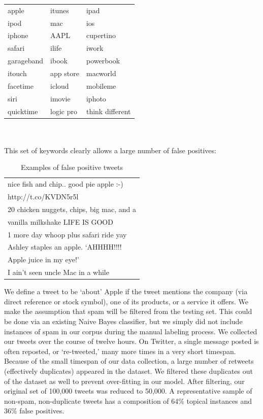 \documentclass[letterpaper]{article}
\begin{document}
\begin{tabular}{l l l}
apple & itunes & ipad \\
ipod & mac & ios \\
iphone & AAPL & cupertino \\
safari&ilife&iwork \\
garageband&ibook&powerbook \\
itouch&app store&macworld \\
facetime&icloud&mobileme \\
siri&imovie&iphoto \\
quicktime&logic pro&think different
\end{tabular} \\
~\\

This set of keywords clearly allows a large number of false positives:

\begin{table}[ht]
\centering
\begin{tabular}{|l|}
	\hline
	nice fish and chip.. good pie apple :-) \\ http://t.co/KVDN5r5l \\ \hline
	20 chicken nuggets, chips, big mac, and a \\ vanilla milkshake LIFE IS GOOD \\ \hline
	1 more day whoop plus safari ride yay \\ \hline
	Ashley staples an apple.  `AHHHH!!!! \\ Apple juice in my eye!' \\ \hline
	I ain't seen uncle Mac in a while \\
	\hline
\end{tabular}
\caption{Examples of false positive tweets}
\label{tab:myfirsttable}
\end{table}


We define a tweet to be `about' Apple if the tweet mentions the company (via direct reference or stock symbol), one of its products, or a service it offers. We make the assumption that spam will be filtered from the testing set. This could be done via an existing Naive Bayes classifier, %
 but we simply did not include instances of spam in our corpus during the manual labeling process. We collected our tweets over the course of twelve hours. On Twitter, a single message posted is often reposted, or `re-tweeted,' many more times in a very short timespan. Because of the small timespan of our data collection, a large number of retweets (effectively duplicates) appeared in the dataset. We filtered these duplicates out of the dataset as well to prevent over-fitting in our model. After filtering, our original set of 100,000 tweets was reduced to 50,000. A representative sample of non-spam, non-duplicate tweets has a composition of 64\% topical instances and 36\% false positives.
\end{document}
